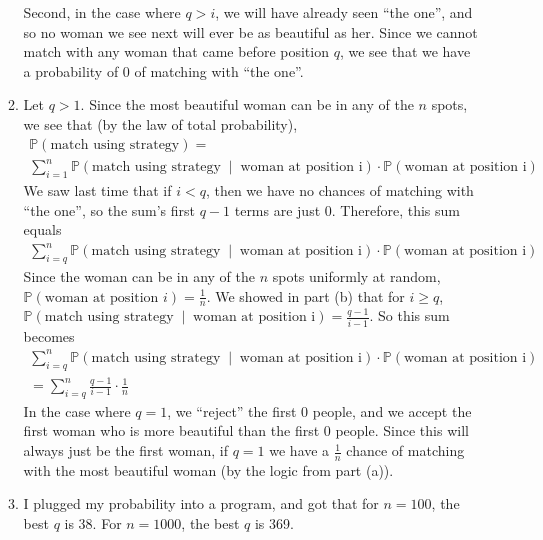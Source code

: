 \documentclass[12pt]{article}
\theoremstyle{definition}
\theoremstyle{remark}
\renewcommand{\P}{\mathbb{P}}
\begin{document}
\begin{enumerate}[leftmargin=\labelsep]
\begin{enumerate}
			Second, in the case where $q > i$, we will have already seen ``the one'', and so no woman we see next will ever be as beautiful as her. Since we cannot match with any woman that came before position $q$, we see that we have a probability of 0 of matching with ``the one''.
			
			\item Let $q > 1$. Since the most beautiful woman can be in any of the $n$ spots, we see that (by the law of total probability),
			\begin{align*}
				\P(\text{match using strategy}) =\\
				 \sum_{i=1}^{n} \P(\text{match using strategy} \;\mid\; \text{woman at position i}) \cdot \P(\text{woman at position i})
			\end{align*}
			We saw last time that if $i < q$, then we have no chances of matching with ``the one'', so the sum's first $q-1$ terms are just 0. Therefore, this sum equals
			\begin{align*}
				\sum_{i=q}^{n} \P(\text{match using strategy} \;\mid\; \text{woman at position i}) \cdot \P(\text{woman at position i})
			\end{align*}
			Since the woman can be in any of the $n$ spots uniformly at random, $\P(\text{woman at position $i$}) = \frac 1n$. We showed in part (b) that for $i \geq q$, $\P(\text{match using strategy} \;\mid\; \text{woman at position i}) = \frac{q-1}{i-1}$. So this sum becomes
			\begin{align*}
				\sum_{i=q}^{n} \P(\text{match using strategy} \;\mid\; \text{woman at position i}) \cdot \P(\text{woman at position i}) \\
				= \sum_{i=q}^{n} \frac{q-1}{i-1} \cdot \frac 1n
			\end{align*}
			In the case where $q = 1$, we ``reject'' the first 0 people, and we accept the first woman who is more beautiful than the first 0 people. Since this will always just be the first woman, if $q=1$ we have a $\frac{1}{n}$ chance of matching with the most beautiful woman (by the logic from part (a)).
			
			\item I plugged my probability into a program, and got that for $n = 100$, the best $q$ is 38. For $n = 1000$, the best $q$ is 369. 
		\end{enumerate}
	\end{enumerate}
\end{document}
